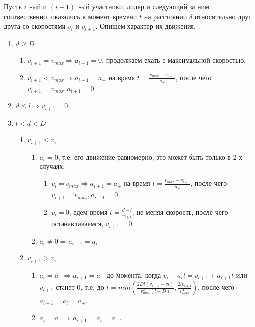 \documentclass[12pt, a4paper]{article}
\begin{document}
	
	Пусть $i$~-ый и $(i+1)$~-ый участники, лидер и следующий за ним соотвественно, оказались в момент времени $t$ на расстоянии $d$ относительно друг друга со скоростями $v_i$ и $v_{i+1}$. Опишем характер их движения.
	
	
	\begin{enumerate}
		\item $d \ge D $
		\begin{enumerate}
			\item $v_{i+1} = v_{max} \Rightarrow a_{i+1} = 0$, продолжаем ехать с максимальной скоростью.
			\item $v_{i+1} < v_{max} \Rightarrow a_{i+1} = a_+$ на время $t = \frac{v_{max}-v_{i+1}}{a_+}$, после чего $v_{i+1} = v_{max}, a_{i+1} = 0$
		\end{enumerate}	
		\item $d \leq l \Rightarrow v_{i+1} = 0$
		\item $l < d < D $
		\begin{enumerate}
			\item $v_{i+1} \leq v_i$
			\begin{enumerate}
				\item $a_i = 0$, т.е. его движение равномерно, это может быть только в 2-х случаях:
				\begin{enumerate}
					\item $v_i = v_{max} \Rightarrow a_{i+1} = a_+$ на время $t = \frac{v_{max}-v_{i+1}}{a_+}$, после чего $v_{i+1} = v_{max}, a_{i+1} = 0$
					\item $v_i = 0$, едем время $t = \frac{d-l}{v_{i+1}}$, не меняя скорость, после чего останавливаемся, $v_{i+1} = 0$.
				\end{enumerate}	
				\item $a_i \neq 0 \Rightarrow a_{i+1} = a_i$ 
			\end{enumerate}
			\item $v_{i+1} > v_i$ 
			\begin{enumerate}
				\item $a_i = a_+ \Rightarrow a_{i+1} = a_-$ до момента, когда $v_i + a_it = v_{i+1} + a_{i+1}t$ или $v_{i+1}$ станет $0$, т.е. до $t = min\left(\frac{2Dl(v_{i+1}-vi)}{v^2_{max}(l+D)}, \frac{2lv_{i+1}}{v^2_{max}}\right)$,  после чего $a_{i+1} = a_i = a_+$. 
				\item $a_i = a_- \Rightarrow a_{i+1} = a_i = a_-$.
			\end{enumerate}	
		\end{enumerate}
	\end{enumerate}
	
\end{document}
